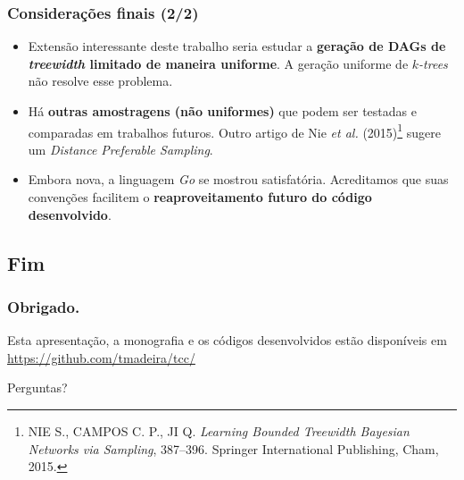 \documentclass{beamer}
\begin{document}
  \begin{frame}
    \frametitle{Considerações finais (2/2)}

    \begin{itemize}
      \item Extensão interessante deste trabalho seria estudar a \textbf{geração de DAGs de \emph{treewidth} limitado de maneira uniforme}. A geração uniforme de \emph{$k$-trees} não resolve esse problema.
      \item Há \textbf{outras amostragens (não uniformes)} que podem ser testadas e comparadas em trabalhos futuros. Outro artigo de Nie \emph{et al.} (2015)\footnote{\scriptsize NIE S., CAMPOS C. P., JI Q. \emph{Learning Bounded Treewidth Bayesian Networks via Sampling}, 387--396. Springer International Publishing, Cham, 2015.} sugere um \emph{Distance Preferable Sampling}.
      \item Embora nova, a linguagem \emph{Go} se mostrou satisfatória. Acreditamos que suas convenções facilitem o \textbf{reaproveitamento futuro do código desenvolvido}.
    \end{itemize}
  \end{frame}

  \subsection{Fim}

  \begin{frame}
    \frametitle{Obrigado.}

    Esta apresentação, a monografia e os códigos desenvolvidos estão disponíveis em \url{https://github.com/tmadeira/tcc/}

    \vspace{1em}

    Perguntas?
  \end{frame}
\end{document}
